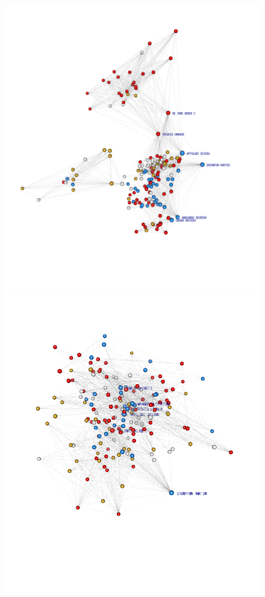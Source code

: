 \begin{figure}[!h]
\center
\includegraphics[scale=0.22,trim={5cm 2cm 2cm 0}]{Chapters/tb/statMod/lnm_mod1.png}
\vspace{0px}\\
\includegraphics[scale=0.22,trim={5cm 2cm 2cm 5cm}]{Chapters/tb/statMod/lnm_mod5_AllNodal.png}

\end{figure}
